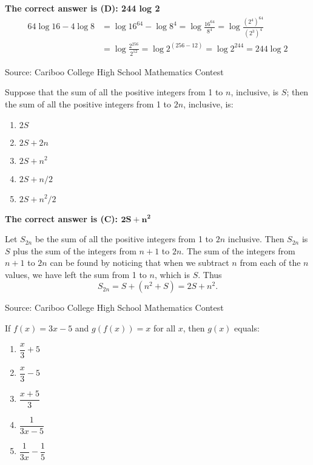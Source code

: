 \documentclass{article}
\begin{document}
\textbf{The correct answer is (D): 244 log 2}
\begin{align*}
64 \log 16 - 4 \log 8	&= \log 16^{64} - \log 8^4 = \log \frac{16^{64}}{8^4} = \log \frac{(2^4\!)^{64}}{(2^3\!)^4}\\
											&= \log \frac{2^{256}}{2^{12}} = \log 2^{(256-12)} = \log 2^{244} = 244 \log 2
\end{align*}

\vskip 1.5cm


\scriptsize
Source: Cariboo College High School Mathematics Contest

\normalsize
Suppose that the sum of all the positive integers from 1 to $n$, inclusive, is $S$; then the sum of all the positive integers from 1 to $2n$, inclusive, is:
\begin{enumerate}[noitemsep,topsep=0mm,leftmargin=*,widest=D,label=\Alph*)]
	\item $2S$
	\item $2S + 2n$
	\item $2S + n^2$
	\item $2S + n/2$
	\item $2S + n^2/2$
\end{enumerate}

\textbf{The correct answer is (C): $\mathbf{2S + n^2}$}

Let $S_{2n}$ be the sum of all the positive integers from 1 to $2n$ inclusive. Then $S_{2n}$ is $S$ plus the sum of the integers from $n+1$ to $2n$. The sum of the integers from $n+1$ to $2n$ can be found by noticing that when we subtract $n$ from each of the $n$ values, we have left the sum from 1 to $n$, which is $S$. Thus
\[
S_{2n} = S+(n^2+S)=2S+n^2.
\]

\vskip 1.5cm


\scriptsize
Source: Cariboo College High School Mathematics Contest

\normalsize
If $f(x)=3x-5$ and $g(f(x))=x$ for all $x$, then $g(x)$ equals:
\begin{enumerate}[topsep=0mm,leftmargin=*,widest=D,label=\Alph*)]
	\item $\dfrac{x}{3}+5$
	\item $\dfrac{x}{3}-5$
	\item $\dfrac{x+5}{3}$
	\item $\dfrac{1}{3x-5}$
	\item $\dfrac{1}{3x}-\dfrac{1}{5}$
\end{enumerate}
\end{document}
